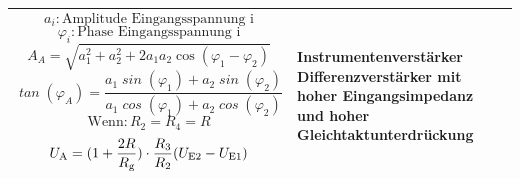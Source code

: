 \begin{table}[ht]
\begin{tabular}{|m{}|m{}|m{}|}
        \vspace{1ex}
        \[
            \mathit{a_i} : \text{Amplitude Eingangsspannung i}
        \]
        \[
            \mathit{\varphi_i} : \text{Phase Eingangsspannung i}
        \]
        \[
            \mathit{A}_{A} = \sqrt{a_1^2 + a_2^2 + 2a_1a_2 \cos(\varphi_1 - \varphi_2)}
        \]
        \[
            \mathit{\tan}(\varphi_A) = \frac{a_1 \mathit{\sin}(\varphi_1) + a_2 \mathit{\sin}(\varphi_2)}{a_1 \mathit{\cos}(\varphi_1) + a_2 \mathit{\cos}(\varphi_2)}
        \]
        \[
            \text{Wenn} : R_2 = R_4 = R
        \]
        \[
            U_{\textnormal{A}} = (1+ \frac{2R} {R_{\textnormal{g}}}) \cdot \frac{R_3} {R_2} (U_{\textnormal{E2}}-U_{\textnormal{E1}})
        \]
                  &
        \textbf{Instrumentenverstärker}\newline
        \index{Operationsverstärker>Instrumentenverstärker}
        Differenzverstärker mit hoher Eingangsimpedanz und hoher Gleichtaktunterdrückung

        \\
        \hline
    \end{tabular}
\end{table}